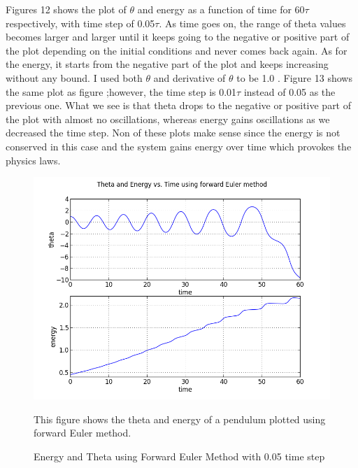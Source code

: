 \documentclass[letterpaper,12pt]{article}
\begin{document}
Figures 12 shows the plot of \begin{math} \theta \end{math} and energy as a function of time for 60\begin{math} \tau \end{math} respectively, with time step of 0.05\begin{math} \tau \end{math}. As time goes on, the range of theta values becomes larger and larger until it keeps going to the negative or positive part of the plot depending on the initial conditions and never comes back again. As for the energy, it starts from the negative part of the plot and keeps increasing without any bound. I used both \begin{math} \theta \end{math} and derivative of \begin{math} \theta \end{math} to be 1.0 .
Figure 13 shows the same plot as figure ;however, the time step is 0.01\begin{math} \tau \end{math} instead of 0.05 as the previous one. What we see is that theta drops to the negative or positive part of the plot with almost no oscillations, whereas energy gains oscillations as we decreased the time step.
Non of these plots make sense since the energy is not conserved in this case and the system gains energy over time which provokes the physics laws.
\FloatBarrier
\begin{figure}[h!]
\centering
\includegraphics[scale=0.7]{2_a.png}
\caption{Energy and Theta using Forward Euler Method with 0.05 time step}
This figure shows the theta and energy of a pendulum plotted using forward Euler method.
\end{figure}
\FloatBarrier
\end{document}
